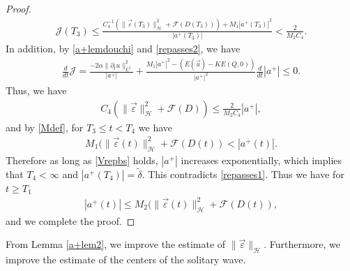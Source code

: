 \documentclass[reqno]{amsart}
\theoremstyle{plain}
\theoremstyle{definition}
\numberwithin{equation}{section}
\newcommand{\1}{\mathbbm{1}}
\begin{document}
\begin{proof}
\begin{align}
\mathcal{J}(T_3)\leq \frac{C_4^{-1}(\|\vec{\varepsilon}(T_3)\|_{\mathcal{H}}^2+\mathcal{F}(D(T_3)))+M_1|a^+(T_3)|^2}{|a^+(T_3)|}<\frac{2}{M_2C_4}.
\end{align}
In addition, by \eqref{a+lemdouchi} and \eqref{repasses2}, we have
\begin{align*}
\frac{d}{dt}\mathcal{J}=\frac{-2\alpha\|{\partial}_tu\|_{L^2}^2}{|a^+|}+\frac{ M_1|a^+|^2-(E(\vec{u})-KE(Q,0))}{|a^+|^2}\frac{d}{dt}|a^+|\leq 0.
\end{align*}
Thus, we have
\begin{align*}
C_4(\|\vec{\varepsilon}\|_{\mathcal{H}}^2+\mathcal{F}(D))\leq \frac{2}{M_2C_4} |a^+|,
\end{align*}
and by \eqref{Mdef}, for $T_3\leq t<T_4$ we have
\begin{align}\label{bsleft}
M_1(\|\vec{\varepsilon}(t)\|_{\mathcal{H}}^2+\mathcal{F}(D(t))<|a^+(t)|.
\end{align}
Therefore as long as \eqref{Vrepbs} holds, $|a^+|$ increases exponentially, which implies that $T_4<\infty$ and $|a^+(T_4)|=\tilde{\delta}$. This contradicts \eqref{repasses1}. Thus we have for $t\geq T_1$
\begin{align*}
|a^+(t)|\leq M_2(\|\vec{\varepsilon}(t)\|_{\mathcal{H}}^2+\mathcal{F}(D(t)),
\end{align*}
and we complete the proof.
\end{proof}
From Lemma \ref{a+lem2}, we improve the estimate of $\|\vec{\varepsilon}\|_{\mathcal{H}}$. Furthermore,  we improve the estimate of the centers of the solitary wave.
\end{document}
